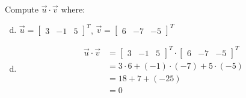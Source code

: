 \documentclass[../main.tex]{subfiles}
\begin{document}
Compute $\vec{u}\cdot\vec{v}$ where:
\begin{enumerate}[a)]
	\setcounter{enumi}{3}
	\item
		$\vec{u} = \begin{bmatrix}3&-1&5\end{bmatrix}^T$,
		$\vec{v} = \begin{bmatrix}6&-7&-5\end{bmatrix}^T$
\end{enumerate}

\solution
\begin{enumerate}[a)]
	\setcounter{enumi}{3}
	\item 
		\begin{align*}
			\vec{u}\cdot\vec{v} &=
			\begin{bmatrix}3&-1&5\end{bmatrix}^T
			\cdot
			\begin{bmatrix}6&-7&-5\end{bmatrix}^T \\
			&= 3\cdot6 + (-1)\cdot(-7) + 5\cdot(-5) \\
			&= 18 + 7 + (-25) \\
			&= 0
		\end{align*}
\end{enumerate}
\end{document}
